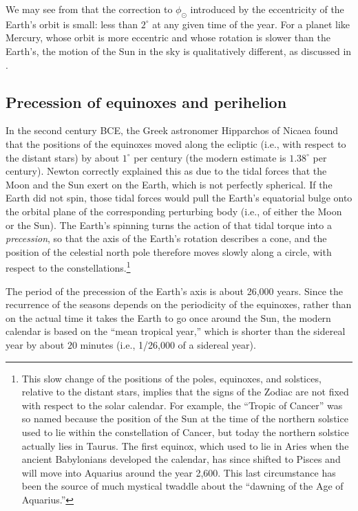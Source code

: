 We may see from  that the correction to $\phi_\odot$ introduced by the eccentricity of the Earth's orbit is small: less than $2^\circ$ at any given time of the year.  For a planet like Mercury, whose orbit is more eccentric and whose rotation is slower than the Earth's, the motion of the Sun in the sky is qualitatively different, as discussed in \citep{Mercury}.

\subsection{Precession of equinoxes and perihelion}

In the second century BCE, the Greek astronomer Hipparchos of Nicaea found that the positions of the equinoxes moved along the ecliptic (i.e., with respect to the distant stars) by about $1^\circ$ per century (the modern estimate is $1.38^\circ$ per century).  Newton correctly explained this as due to the tidal forces that the Moon and the Sun exert on the Earth, which is not perfectly spherical.  If the Earth did not spin, those tidal forces would pull the Earth's equatorial bulge onto the orbital plane of the corresponding perturbing body (i.e., of either the Moon or the Sun).  The Earth's spinning turns the action of that tidal torque into a {\it precession}, so that the axis of the Earth's rotation describes a cone, and the position of the celestial north pole therefore moves slowly along a circle, with respect to the constellations.\footnote{This slow change of the positions of the poles, equinoxes, and solstices, relative to the distant stars, implies that the signs of the Zodiac are not fixed with respect to the solar calendar.  For example, the ``Tropic of Cancer'' was so named because the position of the Sun at the time of the northern solstice used to lie within the constellation of Cancer, but today the northern solstice actually lies in Taurus.  The first equinox, which used to lie in Aries when the ancient Babylonians developed the calendar, has since shifted to Pisces and will move into Aquarius around the year 2,600.  This last circumstance has been the source of much mystical twaddle about the ``dawning of the Age of Aquarius.''}

The period of the precession of the Earth's axis is about 26,000 years.  Since the recurrence of the seasons depends on the periodicity of the equinoxes, rather than on the actual time it takes the Earth to go once around the Sun, the modern calendar is based on the ``mean tropical year,'' which is shorter than the sidereal year by about $20$ minutes (i.e., 1/26,000 of a sidereal year).

